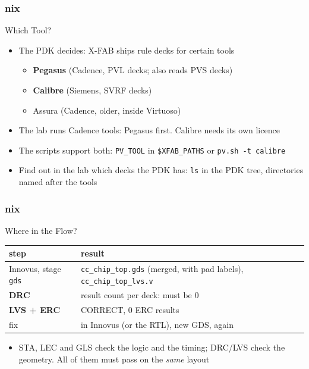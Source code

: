 \documentclass{beamer}
\newcommand{\astitle}{nix}
\newcommand{\assubtitle}{nix}
\newcommand{\cmd}[1]{\texttt{#1}}
\begin{document}
\renewcommand{\assubtitle}{Which Tool?}
\begin{frame}
\frametitle{\astitle}
\begin{block}{\assubtitle}
  \begin{itemize}
    \item The PDK decides: X-FAB ships rule decks for certain tools
    \begin{itemize}
      \item \textbf{Pegasus} (Cadence, PVL decks; also reads PVS decks)
      \item \textbf{Calibre} (Siemens, SVRF decks)
      \item Assura (Cadence, older, inside Virtuoso)
    \end{itemize}
    \item The lab runs Cadence tools: Pegasus first. Calibre needs its
      own licence
    \item The scripts support both: \cmd{PV\_TOOL} in \cmd{\$XFAB\_PATHS}
      or \cmd{pv.sh -t calibre}
    \item Find out in the lab which decks the PDK has:
      \cmd{ls} in the PDK tree, directories named after the tools
  \end{itemize}
\end{block}
\end{frame}

\renewcommand{\assubtitle}{Where in the Flow?}
\begin{frame}
\frametitle{\astitle}
\begin{block}{\assubtitle}
  \footnotesize
  \begin{tabularx}{\linewidth}{@{}lY@{}}
    \textbf{step} & \textbf{result}\\\hline
    Innovus, stage \cmd{gds}  & \cmd{cc\_chip\_top.gds} (merged, with pad
                                labels), \cmd{cc\_chip\_top\_lvs.v}\\
    \textbf{DRC}              & result count per deck: must be 0\\
    \textbf{LVS + ERC}        & CORRECT, 0 ERC results\\
    fix                       & in Innovus (or the RTL), new GDS, again\\
  \end{tabularx}
  \vspace{4pt}
  \begin{itemize}
    \item STA, LEC and GLS check the logic and the timing; DRC/LVS check
      the geometry. All of them must pass on the \emph{same} layout
  \end{itemize}
\end{block}
\end{frame}
\end{document}
